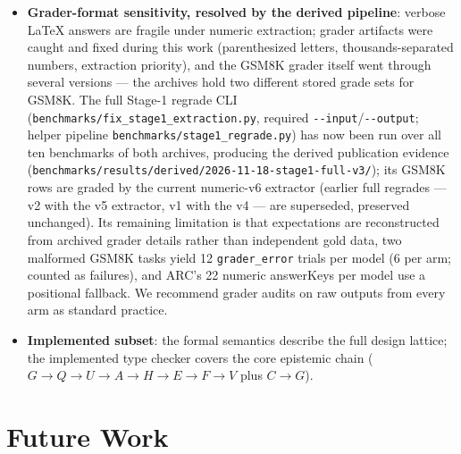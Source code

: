 \documentclass[11pt,a4paper]{article}
\begin{document}
\begin{itemize}[nosep,leftmargin=*]
    \item \textbf{Grader-format sensitivity, resolved by the derived pipeline}: verbose LaTeX answers are fragile under numeric extraction; grader artifacts were caught and fixed during this work (parenthesized letters, thousands-separated numbers, extraction priority), and the GSM8K grader itself went through several versions --- the archives hold two different stored grade sets for GSM8K. The full Stage-1 regrade CLI (\texttt{benchmarks/fix\_stage1\_extraction.py}, required \texttt{-{}-input}/\texttt{-{}-output}; helper pipeline \texttt{benchmarks/stage1\_regrade.py}) has now been run over all ten benchmarks of both archives, producing the derived publication evidence (\texttt{benchmarks/results/derived/2026-11-18-stage1-full-v3/}); its GSM8K rows are graded by the current numeric-v6 extractor (earlier full regrades --- v2 with the v5 extractor, v1 with the v4 --- are superseded, preserved unchanged). Its remaining limitation is that expectations are reconstructed from archived grader details rather than independent gold data, two malformed GSM8K tasks yield 12 \texttt{grader\_error} trials per model (6 per arm; counted as failures), and ARC's 22 numeric answerKeys per model use a positional fallback. We recommend grader audits on raw outputs from every arm as standard practice.
    \item \textbf{Implemented subset}: the formal semantics describe the full design lattice; the implemented type checker covers the core epistemic chain ($G \to Q \to U \to A \to H \to E \to F \to V$ plus $C \to G$).
\end{itemize}

\section{Future Work}
\label{sec:future}
\end{document}

